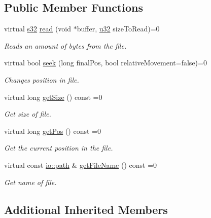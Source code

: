 \subsection*{Public Member Functions}
\begin{DoxyCompactItemize}
\item 
virtual \hyperlink{namespaceirr_ac66849b7a6ed16e30ebede579f9b47c6}{s32} \hyperlink{classirr_1_1io_1_1IReadFile_ab51878d36bc9dd3964b664055fbeb13f}{read} (void $\ast$buffer, \hyperlink{namespaceirr_a0416a53257075833e7002efd0a18e804}{u32} size\+To\+Read)=0
\begin{DoxyCompactList}\small\item\em Reads an amount of bytes from the file. \end{DoxyCompactList}\item 
virtual bool \hyperlink{classirr_1_1io_1_1IReadFile_ac1cd81f18832e8703838d7abd495bf34}{seek} (long final\+Pos, bool relative\+Movement=false)=0
\begin{DoxyCompactList}\small\item\em Changes position in file. \end{DoxyCompactList}\item 
virtual long \hyperlink{classirr_1_1io_1_1IReadFile_a24cdf0a504497dfa21e5faca19554992}{get\+Size} () const  =0
\begin{DoxyCompactList}\small\item\em Get size of file. \end{DoxyCompactList}\item 
virtual long \hyperlink{classirr_1_1io_1_1IReadFile_a1623dda157d5e60304937de3fbd12a49}{get\+Pos} () const  =0
\begin{DoxyCompactList}\small\item\em Get the current position in the file. \end{DoxyCompactList}\item 
virtual const \hyperlink{namespaceirr_1_1io_ab1bdc45edb3f94d8319c02bc0f840ee1}{io\+::path} \& \hyperlink{classirr_1_1io_1_1IReadFile_a9d0133ac610157cd3a91c10e8423313f}{get\+File\+Name} () const  =0
\begin{DoxyCompactList}\small\item\em Get name of file. \end{DoxyCompactList}\end{DoxyCompactItemize}
\subsection*{Additional Inherited Members}


